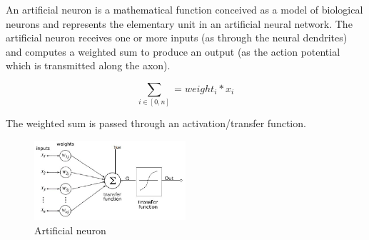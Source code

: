 \documentclass[a4paper,10pt]{article}
\begin{document}
   
 \quad An artificial neuron is a mathematical function conceived as a model of biological neurons and represents the elementary unit in an artificial neural network. The artificial neuron receives one or more inputs (as through the neural dendrites) and computes a weighted sum to produce an output (as the action potential which is transmitted along the axon). 
   
   $$ \sum_{i \in [0,n]} = weight_{i} * x_{i}  $$
   
   The weighted sum is passed through an activation/transfer function.
   
   \begin{figure}[!htbp]
   	\centering
   	\includegraphics[width=0.5\textwidth]{artif.png}
   	\caption{Artificial neuron}
   \end{figure}
  	\vspace{5mm} %
  	
\end{document}

